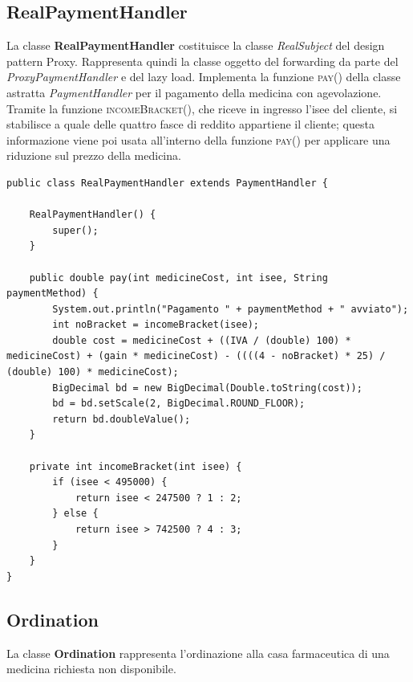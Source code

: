 \documentclass[a4paper, 10pt]{report}
\begin{document}
\subsection{RealPaymentHandler}
La classe \textbf{RealPaymentHandler} costituisce la classe \textit{RealSubject} del design pattern Proxy. Rappresenta quindi la classe oggetto del forwarding da parte del \textit{ProxyPaymentHandler} e del lazy load. Implementa la funzione \textsc{pay()} della classe astratta \textit{PaymentHandler} per il pagamento della medicina con agevolazione. Tramite la funzione \textsc{incomeBracket()}, che riceve in ingresso l'isee del cliente, si stabilisce a quale delle quattro fasce di reddito appartiene il cliente; questa informazione viene poi usata all'interno della funzione \textsc{pay()} per applicare una riduzione sul prezzo della medicina.\\
\begin{lstlisting}
public class RealPaymentHandler extends PaymentHandler {

    RealPaymentHandler() {
        super();
    }

    public double pay(int medicineCost, int isee, String paymentMethod) {
        System.out.println("Pagamento " + paymentMethod + " avviato");
        int noBracket = incomeBracket(isee);
        double cost = medicineCost + ((IVA / (double) 100) * medicineCost) + (gain * medicineCost) - ((((4 - noBracket) * 25) / (double) 100) * medicineCost);
        BigDecimal bd = new BigDecimal(Double.toString(cost));
        bd = bd.setScale(2, BigDecimal.ROUND_FLOOR);
        return bd.doubleValue();
    }

    private int incomeBracket(int isee) {
        if (isee < 495000) {
            return isee < 247500 ? 1 : 2;
        } else {
            return isee > 742500 ? 4 : 3;
        }
    }
}
\end{lstlisting}
\subsection{Ordination}
La classe \textbf{Ordination} rappresenta l'ordinazione alla casa farmaceutica di una medicina richiesta non disponibile.
\end{document}
